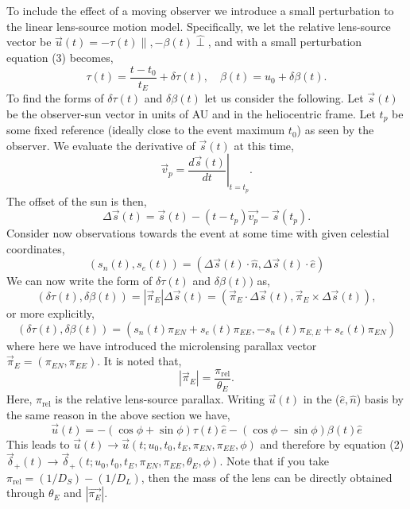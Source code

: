 \documentclass[11pt]{article}
\begin{document}
To include the effect of a moving observer we introduce a small perturbation to the linear
lens-source motion model. Specifically, we let the relative lens-source vector be 
$\vec{u}(t) = -\tau(t)\hat{\parallel},-\beta(t)\hat{\perp}$, and with a small perturbation 
equation (3) becomes,
%
\begin{equation}
\tau(t) = \frac{t-t_{0}}{t_{E}}+\delta\tau(t), \quad \beta(t) =  u_{0}+\delta\beta(t).
\end{equation}
%
To find the forms of $\delta\tau(t)$ and $\delta\beta(t)$ let us consider the following.
Let $\vec{s}(t)$ be the observer-sun vector in units of AU and in the heliocentric frame. 
Let $t_{p}$ be some fixed reference (ideally close to the event maximum $t_{0}$) as seen 
by the observer. We evaluate the derivative of $\vec{s}(t)$ at this time,
%
\begin{equation}
\vec{v}_{p} =\left. \frac{d\vec{s}(t)}{dt}\right|_{t=t_{p}}.
\end{equation}
%
The offset of the sun is then,
%
\begin{equation}
\Delta\vec{s}(t) = \vec{s}(t)-(t-t_{p})\vec{v_{p}}-\vec{s}(t_{p}).
\end{equation}
%
Consider now observations towards the event at some time with given
celestial coordinates,
%
\begin{equation}
(s_{n}(t),s_{e}(t)) = (\Delta\vec{s}(t)\cdot\hat{n},\Delta\vec{s}(t)\cdot\hat{e})
\end{equation}
%
We can now write the form of $\delta\tau(t)$ and $\delta\beta(t))$ as,
%
\begin{equation}
(\delta\tau(t),\delta\beta(t)) = |\vec{\pi}_{E}|\Delta\vec{s}(t) = 
(\vec{\pi}_{E}\cdot\Delta\vec{s}(t),\vec{\pi}_{E}\times\Delta\vec{s}(t)),
\end{equation}
%
or more explicitly,
%
\begin{equation}
(\delta\tau(t),\delta\beta(t)) =  (s_{n}(t)\pi_{EN}+s_{e}(t)\pi_{EE},
                                  -s_{n}(t)\pi_{E,E}+s_{e}(t)\pi_{EN})
\end{equation}
%
where here we have introduced the microlensing parallax vector 
$\vec{\pi}_{E} = (\pi_{EN},\pi_{EE})$. It is noted that,
%
\begin{equation}
|\vec{\pi}_{E}| = \frac{\pi_{\text{rel}}}{\theta_{E}}.
\end{equation}
%
Here, $\pi_{\text{rel}}$ is the relative lens-source parallax.
Writing $\vec{u}(t)$ in the ($\hat{e},\hat{n}$) basis by the same
reason in the above section we have,
%
\begin{equation}
\vec{u}(t) = -(\cos\phi+\sin\phi)\tau(t)\hat{e} - (\cos\phi-\sin\phi)\beta(t)\hat{e}
\end{equation}
%
This leads to $\vec{u}(t) \to \vec{u}(t;u_{0},t_{0},t_{E},\pi_{EN},\pi_{EE},\phi)$ and therefore
by equation (2) $\vec{\delta}_{+}(t) \to \vec{\delta}_{+}(t;u_{0},t_{0},t_{E},\pi_{EN},\pi_{EE},\theta_{E},\phi)$.
Note that if you take $\pi_{\text{rel}}=(1/D_{S})-(1/D_{L})$, then the mass of the lens can be directly
obtained through $\theta_{E}$ and $|\vec{\pi_{E}}|$.
\end{document}
